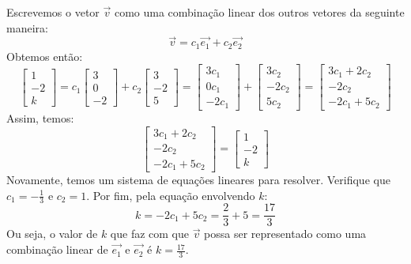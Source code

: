 \begin{resol}
 Escrevemos o vetor $\vec{v}$ como uma combinação linear dos outros vetores da seguinte maneira:
\begin{equation}
\vec{v} = c_1\vec{e_1} + c_2\vec{e_2}
\end{equation}
Obtemos então:
\begin{equation}
\left[
  \begin{array}{c}
  1 \\
  -2 \\
  k
 \end{array}
\right] =
c_1\left[
  \begin{array}{c}
  3 \\
  0 \\
  -2
 \end{array}
\right] +
c_2\left[
  \begin{array}{c}
  3 \\
  -2 \\
  5
 \end{array}
\right] =
\left[
  \begin{array}{c}
  3c_1 \\
  0c_1 \\
  -2c_1
 \end{array}
\right] +
\left[
  \begin{array}{c}
  3c_2 \\
  -2c_2 \\
  5c_2
 \end{array}
\right] = 
\left[
\begin{array}{c}
 3c_1 + 2c_2 \\
 -2c_2 \\
 -2c_1+5c_2
\end{array}
\right]
\end{equation}
Assim, temos:
\begin{equation}
\left[
\begin{array}{c}
 3c_1 + 2c_2 \\
 -2c_2 \\
 -2c_1+5c_2
\end{array}
\right] = 
\left[
 \begin{array}{c}
  1 \\
  -2 \\
  k
 \end{array}
\right]
\end{equation}
Novamente, temos um sistema de equações lineares para resolver. Verifique que $c_1 = -\frac{1}{3}$ e $c_2 = 1$. Por fim, pela equação envolvendo $k$:
\begin{equation}
 k = -2c_1+5c_2 = \frac{2}{3} + 5 = \frac{17}{3}
\end{equation}
Ou seja, o valor de $k$ que faz com que $\vec{v}$ possa ser representado como uma combinação linear de $\vec{e_1}$ e $\vec{e_2}$ é $k = \frac{17}{3}$. 
\end{resol}


